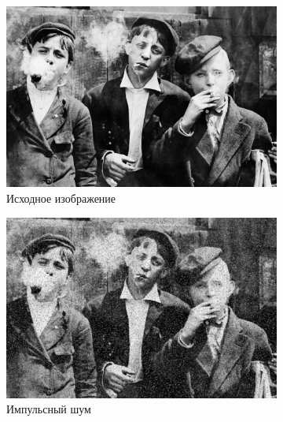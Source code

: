 \begin{figure}[ht] 
    \centering
    \begin{subfigure}[b]{0.5\linewidth}
        \centering
        \includegraphics[width=0.95\linewidth]{../lewis-hine-taschen-main-3.jpg} 
        \caption{Исходное изображение} 
        \label{gaussian_3:a} 
        \vspace{4ex}
    \end{subfigure}%
    \begin{subfigure}[b]{0.5\linewidth}
      \centering
      \includegraphics[width=0.95\linewidth]{../Gaussian_Blur/Gaussian_Blur_Impulse_noise_(3,3).jpg} 
      \caption{Импульсный шум} 
      \label{gaussian_3:b} 
      \vspace{4ex}
    \end{subfigure}
    \begin{subfigure}[b]{0.5\linewidth}
      \centering

\end{subfigure}
\end{figure}
